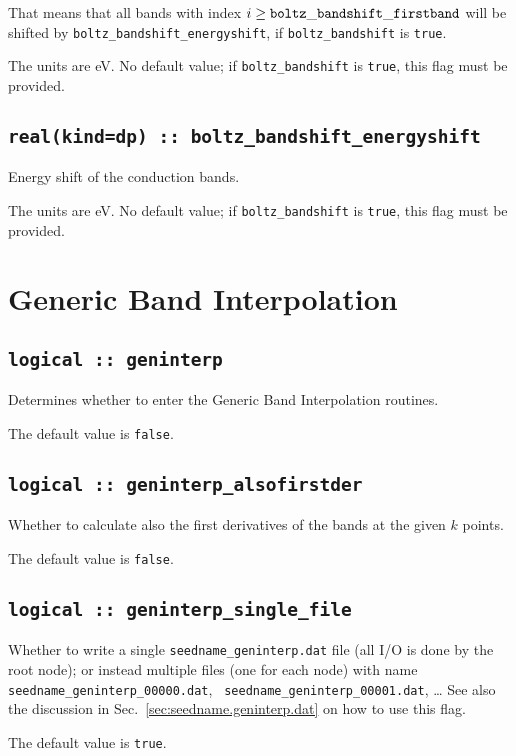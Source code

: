 That means that all bands with index $i\ge {\tt boltz\_bandshift\_firstband}$ will be shifted by  {\tt boltz\_bandshift\_energyshift}, if {\tt boltz\_bandshift} is \verb#true#.

The units are eV.
No default value; if {\tt boltz\_bandshift} is \verb#true#, this flag must be provided.

\subsection[boltz\_bandshift\_energyshift]{\tt real(kind=dp) :: boltz\_bandshift\_energyshift}
Energy shift of the conduction bands.

The units are eV.
No default value; if {\tt boltz\_bandshift} is \verb#true#, this flag must be provided.


\section{Generic Band Interpolation}
\subsection[boltzwann]{\tt logical :: geninterp}
Determines whether to enter the Generic Band Interpolation routines.

The default value is \verb#false#.

\subsection[geninterp\_alsofirstder]{\tt logical :: geninterp\_alsofirstder}
Whether to calculate also the first derivatives of the bands at the
given $k$ points.

The default value is \verb#false#.

\subsection[geninterp\_alsofirstder]{\tt logical :: geninterp\_single\_file}
Whether to write a single  {\tt seedname\_geninterp.dat} file (all I/O is done by the root node); or
instead multiple files (one for each node) with
name {\tt seedname\_geninterp\_00000.dat}, {\tt
  seedname\_geninterp\_00001.dat}, \ldots
See also the discussion in Sec.~\ref{sec:seedname.geninterp.dat} on
how to use this flag.

The default value is \verb#true#.
